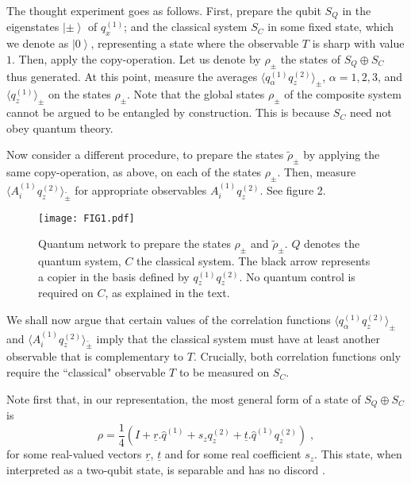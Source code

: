 \documentclass[prl,twocolumn,showpacs,preprintnumbers,amsmath,amssymb]{revtex4}
\newcommand{\ket}[1]{\left | #1 \right\rangle}
\newcommand{\qq}[1]{``#1"}
\begin{document}
 The thought experiment goes as follows. First, prepare the qubit $S_Q$ in the eigenstates $\ket{\pm}$ of $q_x^{(1)}$; and the classical system $S_C$ in some fixed state, which we denote as $\ket{0}$, representing a state where the observable $T$ is sharp with value $1$. Then, apply the copy-operation. Let us denote by $\rho_{\pm}$ the states of $S_Q\oplus S_C$ thus generated.  At this point, measure the averages $\langle q_{\alpha}^{(1)}q_z^{(2)}\rangle_{\pm}$, $\alpha=1,2,3$, and $\langle q_{z}^{(1)}\rangle_{\pm}$ on the states $\rho_{\pm}$. Note that the global states $\rho_{\pm}$ of the composite system cannot be argued to be entangled by construction. This is because $S_C$ need not obey quantum theory.

Now consider a different procedure, to prepare the states  $\tilde{\rho}_{\pm}$ by applying the same copy-operation, as above, on each of the states $\rho_{\pm}$. Then, measure $\langle A_i^{(1)}q_z^{(2)}\rangle_{\tilde \pm}$ for appropriate observables $A_i^{(1)}q_z^{(2)}$. See figure 2. 



\begin{figure}[h]
	\centering
	\texttt{[image: FIG1.pdf]} 
	\caption{Quantum network to prepare the states $\rho_{\pm}$ and ${\tilde\rho_{\pm}}$. $Q$ denotes the quantum system, $C$ the classical system. The black arrow represents a copier in the basis defined by  $q_z^{(1)}q_z^{(2)}$. No quantum control is required on $C$, as explained in the text.}
\end{figure}



We shall now argue that certain values of the correlation functions $\langle q_{\alpha}^{(1)}q_z^{(2)}\rangle_{\pm}$ and $\langle A_i^{(1)}q_z^{(2)}\rangle_{\tilde \pm}$ imply that the classical system must have at least another observable that is complementary to $T$. Crucially, both correlation functions only require the \qq{classical} observable $T$ to be measured on $S_C$.

Note first that, in our representation, the most general form of a state of $S_Q\oplus S_C$ is $$\rho = \frac{1}{4} \left ( I +\underline{r}.\hat q^{(1)}+s_z q_z^{(2)}+ \underline{t}.\hat q^{(1)} q_z^{(2)}\right)\;,$$
for some real-valued vectors $\underline r$, $\underline t$ and for some real coefficient $s_z$. This state, when interpreted as a two-qubit state, is separable and has no discord \cite{KAVAN}. 
\end{document}
